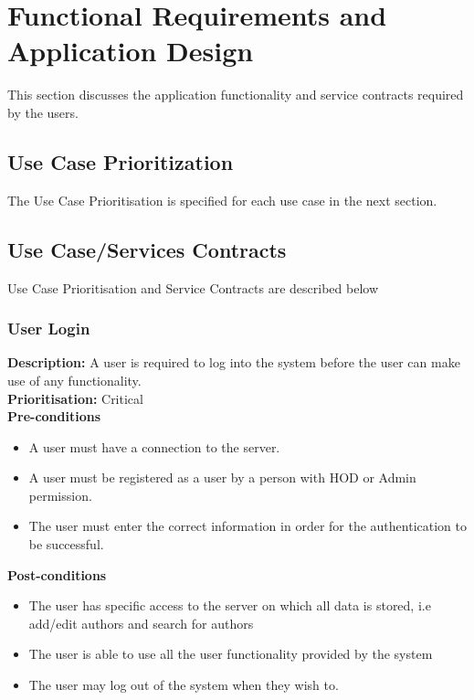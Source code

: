 \documentclass[a4paper]{article}
\begin{document}
	\pagebreak
	
	
	
	
	
	
	
	
	
	
	
	
	
	
	
	
	
	
	
	\section{Functional Requirements and Application Design}
	This section discusses the application functionality and service contracts required by the users.
	\subsection{Use Case Prioritization}
	The Use Case Prioritisation is specified for each use case in the next section.
	
	\subsection{Use Case/Services Contracts}
	Use Case Prioritisation and Service Contracts are described below
	
	\subsubsection{User Login}
	\textbf{Description:}  A user is required to log into the system before the user can make use of any functionality.
	\\
	\textbf{Prioritisation:} Critical\\
	
	
	\textbf{Pre-conditions}
	\begin{itemize}
		\item A user must have a connection to the server.
		\item A user must be registered as a user by a person with HOD or Admin permission.
		\item The user must enter the correct information in order for the authentication to be successful.
	\end{itemize}
	
	\textbf{Post-conditions}
	\begin{itemize}
		\item The user has specific access to the server on which all data is stored, i.e add/edit authors and search for authors
		\item The user is able to use all the user functionality provided by the system 
		\item The user may log out of the system when they wish to.
	\end{itemize}
	
\end{document}
